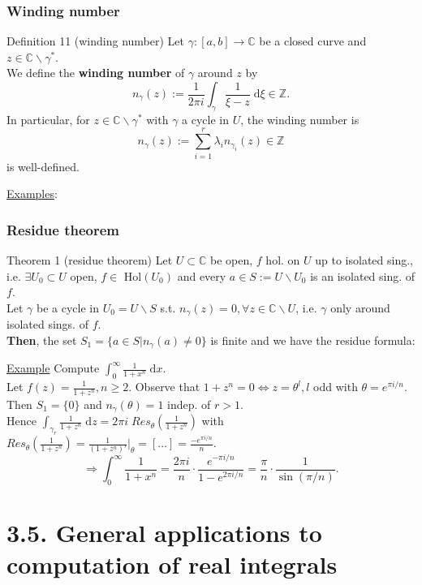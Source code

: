 \documentclass[10pt]{beamer}
\newcommand{\C}{\mathbb{C}}
\newcommand{\Z}{\mathbb{Z}}
\begin{document}
{\begin{frame} \frametitle{Winding number}
\begin{alertblock}{Definition 11 (winding number)}
Let $\gamma:[a,b] \rightarrow \C$ be a closed curve and $z\in \C \backslash \gamma^*$.\\
We define the \textbf{winding number} of $\gamma$ around $z$ by
$$n_\gamma(z):=\frac{1}{2\pi i} \int_\gamma \frac{1}{\xi-z} \; \text{d}\xi \in \Z.$$
In particular, for $z\in \C\backslash \gamma^*$ with $\gamma$ a cycle in $U$, the winding number is
$$n_\gamma(z):=\sum_{i=1}^r \lambda_i n_{\gamma_i}(z)\in \Z$$
is well-defined.
\end{alertblock}
\underline{Examples}:\\
\vspace{2cm}
\end{frame}

\begin{frame} \frametitle{Residue theorem}
\begin{block}{Theorem 1 (residue theorem)}
Let $U\subset \C$ be open, $f$ hol. on $U$ up to isolated sing., i.e. $\exists U_0 \subset U$ open, $f\in$ Hol$(U_0)$ and every $a\in S:=U\backslash U_0$ is an isolated sing. of $f$.\\
Let $\gamma$ be a cycle in $U_0=U \backslash S$ s.t.  $n_\gamma(z)=0, \forall z\in \C\backslash U$, i.e. $\gamma$ only around isolated sings. of $f$.\\
\textbf{Then}, the set $S_1=\{a \in S|n_\gamma(a) \neq 0\}$ is finite and we have the residue formula:\\
\vspace{1cm}
\end{block}
\underline{Example} Compute $\int_0^\infty \frac{1}{1+x^n} \; \text{d}x.$\\
Let $f(z)=\frac{1}{1+z^n}, n \geq 2$.  Observe that $1+z^n=0 \iff z=\theta^l, l$ odd with $\theta=e^{\pi i/n}$.
Then $S_1=\{0\}$ and $n_\gamma(\theta)=1$ indep. of $r>1$.\\
Hence $\int_{\gamma_r} \frac{1}{1+z^n} \; \text{d}z= 2\pi i \;Res_{\theta}(\frac{1}{1+z^n})$ with
$Res_{\theta}(\frac{1}{1+z^n})=\frac{1}{(1+z^n)'}\Big|_\theta=[\dots]=\frac{-e^{\pi i/n}}{n}.$
$$\Rightarrow \int_0^\infty \frac{1}{1+x^n}=\frac{2\pi i}{n} \cdot \frac{e^{-\pi i/n}}{1-e^{2\pi i/n}}=\frac{\pi}{n}\cdot \frac{1}{\sin(\pi/n)}.$$
\end{frame}


\section{3.5.  General applications to computation of real integrals}

}
\end{document}
